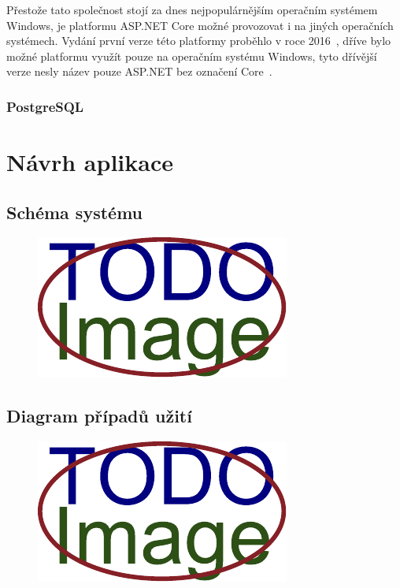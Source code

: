 Přestože tato společnost stojí za dnes nejpopulárnějším operačním systémem Windows, je platformu ASP.NET Core možné provozovat i na jiných operačních systémech. Vydání první verze této platformy proběhlo v roce 2016~\cite{bib:asp-release}, dříve bylo možné platformu využít pouze na operačním systému Windows, tyto dřívější verze nesly název pouze ASP.NET bez označení Core~\cite{bib:asp-what-is}.

\blindtext

\subsection{PostgreSQL}
\blindtext

\chapter{Návrh aplikace}
\blindtext

\section{Schéma systému}
\blindtext
\begin{figure}[H]
	\centering
	\includegraphics[width=\textwidth]{obrazky-figures/placeholder.pdf}
\end{figure}

\section{Diagram případů užití}
\blindtext
\begin{figure}[H]
	\centering
	\includegraphics[width=\textwidth]{obrazky-figures/placeholder.pdf}
\end{figure}

